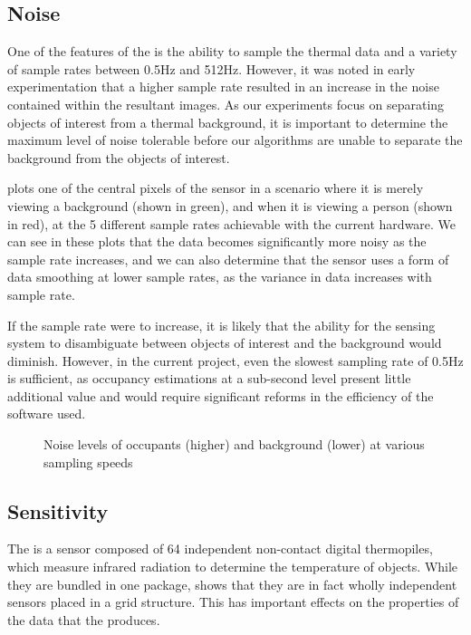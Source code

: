 \documentclass[../thesis/thesis.tex]{subfiles}
\begin{document}
\subsection{Noise}

One of the features of the \mlx is the ability to sample the thermal data and a variety of sample rates between 0.5Hz and 512Hz. However, it was noted in early experimentation that a higher sample rate resulted in an increase in the noise contained within the resultant images. As our experiments focus on separating objects of interest from a thermal background, it is important to determine the maximum level of noise tolerable before our algorithms are unable to separate the background from the objects of interest.

 plots one of the central pixels of the sensor in a scenario where it is merely viewing a background (shown in green), and when it is viewing a person (shown in red), at the 5 different sample rates achievable with the current hardware. We can see in these plots that the data becomes significantly more noisy as the sample rate increases, and we can also determine that the sensor uses a form of data smoothing at lower sample rates, as the variance in data increases with sample rate.

If the sample rate were to increase, it is likely that the ability for the sensing system to disambiguate between objects of interest and the background would diminish. However, in the current project, even the slowest sampling rate of 0.5Hz is sufficient, as occupancy estimations at a sub-second level present little additional value and would require significant reforms in the efficiency of the software used.


\begin{figure}
  \centering
\caption{Noise levels of occupants (higher) and background (lower) at various sampling speeds}
\label{fig:noise}
\end{figure}


\subsection{Sensitivity}

The \mlx is a sensor composed of 64 independent non-contact digital thermopiles, which measure infrared radiation to determine the temperature of objects. While they are bundled in one package,  shows that they are in fact wholly independent sensors placed in a grid structure. This has important effects on the properties of the data that the \mlx produces. 
\end{document}
